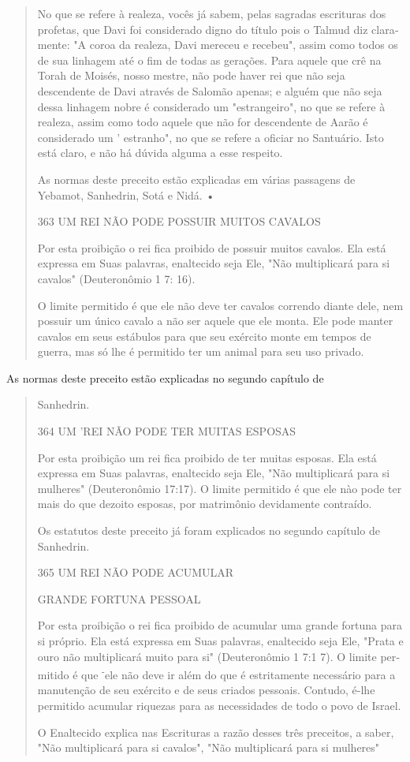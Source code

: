 \begin{quote}
No que se refere à realeza, vocês já sabem, pelas sagradas escrituras
dos profetas, que Davi foi considerado digno do título pois o Talmud diz
clara­mente: "A coroa da realeza, Davi mereceu e recebeu", assim como
todos os de sua linhagem até o fim de todas as gerações. Para aquele que
crê na Torah de Moisés, nosso mestre, não pode haver rei que não seja
descendente de Davi atra­vés de Salomão apenas; e alguém que não seja
dessa linhagem nobre é conside­rado um "estrangeiro", no que se refere à
realeza, assim como todo aquele que não for descendente de Aarão é
considerado um ' estranho", no que se refere a oficiar no Santuário.
Isto está claro, e não há dúvida alguma a esse respeito.

As normas deste preceito estão explicadas em várias passagens de
Yebamot, Sanhedrin, Sotá e Nidá. •

363 UM REI NÃO PODE POSSUIR MUITOS CAVALOS

Por esta proibição o rei fica proibido de possuir muitos cavalos. Ela
está expressa em Suas palavras, enaltecido seja Ele, "Não multiplicará
para si cavalos" (Deuteronômio 1 7: 16).

O limite permitido é que ele não deve ter cavalos correndo diante dele,
nem possuir um único cavalo a não ser aquele que ele monta. Ele pode
manter cavalos em seus estábulos para que seu exército monte em tempos
de guerra, mas só lhe é permitido ter um animal para seu uso privado.
\end{quote}

As normas deste preceito estão explicadas no segundo capítulo de

\begin{quote}
Sanhedrin.

364 UM 'REI NÃO PODE TER MUITAS ESPOSAS

Por esta proibição um rei fica proibido de ter muitas esposas. Ela es­tá
expressa em Suas palavras, enaltecido seja Ele, "Não multiplicará para
si mu­lheres" (Deuteronômio 17:17). O limite permitido é que ele nào
pode ter mais do que dezoito esposas, por matrimônio devidamente
contraído.

Os estatutos deste preceito já foram explicados no segundo capítulo de
Sanhedrin.

365 UM REI NÃO PODE ACUMULAR

GRANDE FORTUNA PESSOAL

Por esta proibição o rei fica proibido de acumular uma grande fortu­na
para si próprio. Ela está expressa em Suas palavras, enaltecido seja
Ele, "Pra­ta e ouro não multiplicará muito para si" (Deuteronômio 1 7:1
7). O limite per­mitido é que \textsuperscript{-}ele não deve ir além do
que é estritamente necessário para a ma­nutenção de seu exército e de
seus criados pessoais. Contudo, é-lhe permitido acumular riquezas para
as necessidades de todo o povo de Israel.

O Enaltecido explica nas Escrituras a razão desses três preceitos, a
saber, "Não multiplicará para si cavalos", "Não multiplicará para si
mulheres"
\end{quote}

